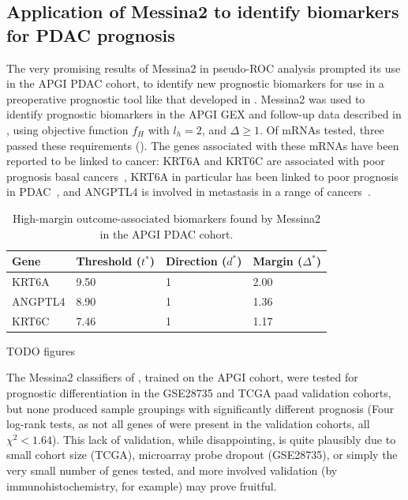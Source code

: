\documentclass[dissertation.tex]{subfiles}
\begin{document}
\subsection[Messina2 identifies candidate \texorpdfstring{\acrshort{PDAC}}{PDAC} biomarkers]{Application of Messina2 to identify biomarkers for \texorpdfstring{\acrshort{PDAC}}{PDAC} prognosis}
The very promising results of Messina2 in pseudo-ROC analysis prompted its use in the \gls{APGI} \gls{PDAC} cohort, to identify new prognostic biomarkers for use in a preoperative prognostic tool like that developed in .  Messina2 was used to identify prognostic biomarkers in the \gls{APGI} \gls{GEX} and follow-up data described in , using objective function $f_H$ with $l_h = 2$, and $\Delta \geq 1$.  Of  mRNAs tested, three passed these requirements ().  The genes associated with these mRNAs have been reported to be linked to cancer: KRT6A and KRT6C are associated with poor prognosis basal cancers~\cite{Choi2014,Livasy2006}, KRT6A in particular has been linked to poor prognosis in \gls{PDAC}~\cite{VandenBroeck2012}, and ANGPTL4 is involved in metastasis in a range of cancers~\cite{Adhikary2013,Kim2011b,Padua2008,Xiao2012}.

\begin{table}[!htb]
\centering
\caption[Outcome-associated biomarkers found by Messina2 in the \texorpdfstring{\acrshort{APGI}}{APGI} \texorpdfstring{\acrshort{PDAC}}{PDAC} cohort]{High-margin outcome-associated biomarkers found by Messina2 in the \acrshort{APGI} \acrshort{PDAC} cohort.}
\label{tab:mess-apgi-leads}
\begin{tabular}{@{}llll@{}}
\toprule
Gene    & Threshold ($t^*$) & Direction ($d^*$) & Margin ($\Delta^*$) \\ \midrule
KRT6A   & 9.50              & 1                 & 2.00                \\
ANGPTL4 & 8.90              & 1                 & 1.36                \\
KRT6C   & 7.46              & 1                 & 1.17                \\
\bottomrule
\end{tabular}
\end{table}

TODO figures

The Messina2 classifiers of , trained on the \gls{APGI} cohort, were tested for prognostic differentiation in the GSE28735 and \gls{TCGA} paad validation cohorts, but none produced sample groupings with significantly different prognosis (Four log-rank tests, as not all genes of  were present in the validation cohorts, all $\chi^2 < 1.64$).  This lack of validation, while disappointing, is quite plausibly due to small cohort size (TCGA), microarray probe dropout (GSE28735), or simply the very small number of genes tested, and more involved validation (by immunohistochemistry, for example) may prove fruitful.
\end{document}
